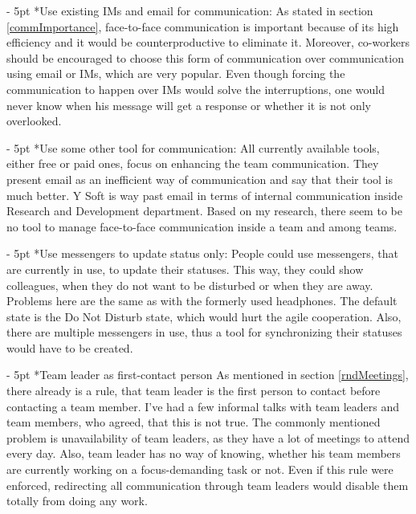 \documentclass[11pt,singleside]{myfithesis2}
\makeatletter
\renewcommand\paragraph{
   \vspace{-10pt}
   \@startsection{paragraph}{4}{0mm}
      {\baselineskip}
      {- 5pt}
      {\normalfont\normalsize\bfseries}
}
\makeatother
\begin{document}
\paragraph*{Use existing IMs and email for communication: } As stated in section \ref{commImportance}, face-to-face communication is important because of its high efficiency and it would be counterproductive to eliminate it. Moreover, co-workers should be encouraged to choose this form of communication over communication using email or IMs, which are very popular. Even though forcing the communication to happen over IMs would solve the interruptions, one would never know when his message will get a response or whether it is not only overlooked.

\paragraph*{Use some other tool for communication: } All currently available tools, either free or paid ones, focus on enhancing the team communication. They present email as an inefficient way of communication and say that their tool is much better. Y Soft is way past email in terms of internal communication inside Research and Development department. Based on my research, there seem to be no tool to manage face-to-face communication inside a team and among teams.

\paragraph*{Use messengers to update status only: } People could use messengers, that are currently in use, to update their statuses. This way, they could show colleagues, when they do not want to be disturbed or when they are away. Problems here are the same as with the formerly used headphones. The default state is the Do Not Disturb state, which would hurt the agile cooperation. Also, there are multiple messengers in use, thus a tool for synchronizing their statuses would have to be created.

\paragraph*{Team leader as first-contact person} As mentioned in section \ref{rndMeetings}, there already is a rule, that team leader is the first person to contact before contacting a team member. I've had a few informal talks with team leaders and team members, who agreed, that this is not true. The commonly mentioned problem is unavailability of team leaders, as they have a lot of meetings to attend every day. Also, team leader has no way of knowing, whether his team members are currently working on a focus-demanding task or not. Even if this rule were enforced, redirecting all communication through team leaders would disable them totally from doing any work.
\end{document}
